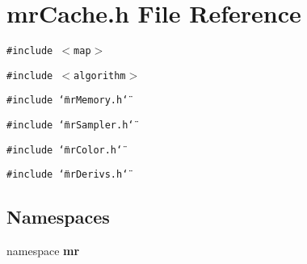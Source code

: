 \section{mr\-Cache.h File Reference}
\label{mrCache_8h}
{\tt \#include $<$map$>$}\par
{\tt \#include $<$algorithm$>$}\par
{\tt \#include \char`\"{}mr\-Memory.h\char`\"{}}\par
{\tt \#include \char`\"{}mr\-Sampler.h\char`\"{}}\par
{\tt \#include \char`\"{}mr\-Color.h\char`\"{}}\par
{\tt \#include \char`\"{}mr\-Derivs.h\char`\"{}}\par
\subsection*{Namespaces}
\begin{CompactItemize}
\item 
namespace {\bf mr}
\end{CompactItemize}
